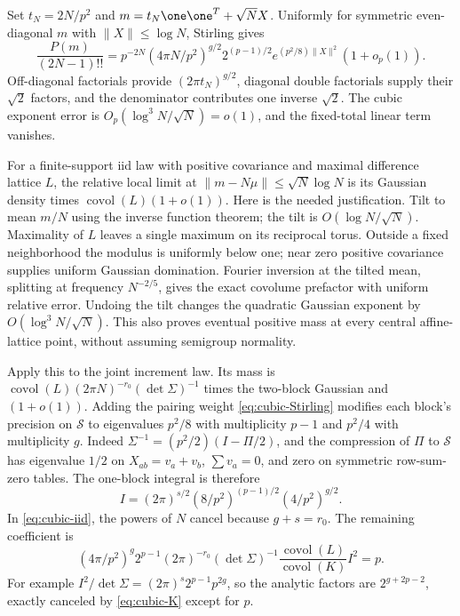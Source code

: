 Set $t_N=2N/p^2$ and $m=t_N\one\one^T+\sqrt N X$.
Uniformly for symmetric even-diagonal $m$ with $\|X\|\le\log N$,
Stirling gives
\begin{equation}\label{eq:cubic-Stirling}
 \frac{P(m)}{(2N-1)!!}
 =p^{-2N}(4\pi N/p^2)^{g/2}2^{(p-1)/2}
                e^{(p^2/8)\|X\|^2}(1+o_p(1)).
\end{equation}
Off-diagonal factorials provide $(2\pi t_N)^{g/2}$, diagonal
double factorials supply their $\sqrt2$ factors, and the denominator
contributes one inverse $\sqrt2$. The cubic exponent error is
$O_p(\log^3N/\sqrt N)=o(1)$, and the fixed-total linear term vanishes.

For a finite-support iid law with positive covariance and maximal
difference lattice $L$, the relative local limit at
$\|m-N\mu\|\le\sqrt N\log N$ is its Gaussian density times
$\operatorname{covol}(L)(1+o(1))$. Here is the needed justification.
Tilt to mean $m/N$ using the inverse function theorem; the tilt is
$O(\log N/\sqrt N)$. Maximality of $L$ leaves a single maximum on
its reciprocal torus. Outside a fixed neighborhood the modulus is
uniformly below one; near zero positive covariance supplies uniform
Gaussian domination. Fourier inversion at the tilted mean, splitting
at frequency $N^{-2/5}$, gives the exact covolume prefactor with
uniform relative error. Undoing the tilt changes the quadratic
Gaussian exponent by $O(\log^3N/\sqrt N)$. This also proves eventual
positive mass at every central affine-lattice point, without assuming
semigroup normality.

Apply this to the joint increment law. Its mass is
$\operatorname{covol}(L)(2\pi N)^{-r_0}(\det\Sigma)^{-1}$
times the two-block Gaussian and $(1+o(1))$.
Adding the pairing weight \eqref{eq:cubic-Stirling} modifies each
block's precision on $\mathcal S$ to eigenvalues $p^2/8$ with
multiplicity $p-1$ and $p^2/4$ with multiplicity $g$.
Indeed $\Sigma^{-1}=(p^2/2)(I-\Pi/2)$, and the compression of
$\Pi$ to $\mathcal S$ has eigenvalue $1/2$ on
$X_{ab}=v_a+v_b$, $\sum v_a=0$, and zero on symmetric row-sum-zero
tables. The one-block integral is therefore
\[
 I=(2\pi)^{s/2}(8/p^2)^{(p-1)/2}(4/p^2)^{g/2}.
\]
In \eqref{eq:cubic-iid}, the powers of $N$ cancel because
$g+s=r_0$. The remaining coefficient is
\begin{equation}\label{eq:cubic-p-coefficient}
 (4\pi/p^2)^g2^{p-1}(2\pi)^{-r_0}(\det\Sigma)^{-1}
 \frac{\operatorname{covol}(L)}{\operatorname{covol}(K)} I^2=p.
\end{equation}
For example $I^2/\det\Sigma=(2\pi)^s2^{p-1}p^{2g}$, so the
analytic factors are $2^{g+2p-2}$, exactly canceled by
\eqref{eq:cubic-K} except for $p$.

